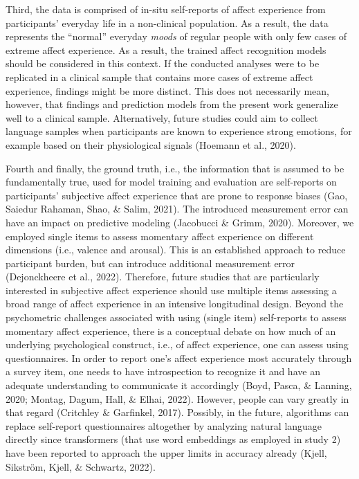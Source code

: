 \documentclass[
  english,
  man,floatsintext]{apa6}
\begin{document}
Third, the data is comprised of in-situ self-reports of affect experience from participants' everyday life in a non-clinical population. As a result, the data represents the ``normal'' everyday \emph{moods} of regular people with only few cases of extreme affect experience. As a result, the trained affect recognition models should be considered in this context. If the conducted analyses were to be replicated in a clinical sample that contains more cases of extreme affect experience, findings might be more distinct. This does not necessarily mean, however, that findings and prediction models from the present work generalize well to a clinical sample. Alternatively, future studies could aim to collect language samples when participants are known to experience strong emotions, for example based on their physiological signals (Hoemann et al., 2020).

Fourth and finally, the ground truth, i.e., the information that is assumed to be fundamentally true, used for model training and evaluation are self-reports on participants' subjective affect experience that are prone to response biases (Gao, Saiedur Rahaman, Shao, \& Salim, 2021). The introduced measurement error can have an impact on predictive modeling (Jacobucci \& Grimm, 2020). Moreover, we employed single items to assess momentary affect experience on different dimensions (i.e., valence and arousal). This is an established approach to reduce participant burden, but can introduce additional measurement error (Dejonckheere et al., 2022). Therefore, future studies that are particularly interested in subjective affect experience should use multiple items assessing a broad range of affect experience in an intensive longitudinal design. Beyond the psychometric challenges associated with using (single item) self-reports to assess momentary affect experience, there is a conceptual debate on how much of an underlying psychological construct, i.e., of affect experience, one can assess using questionnaires. In order to report one's affect experience most accurately through a survey item, one needs to have introspection to recognize it and have an adequate understanding to communicate it accordingly (Boyd, Pasca, \& Lanning, 2020; Montag, Dagum, Hall, \& Elhai, 2022). However, people can vary greatly in that regard (Critchley \& Garfinkel, 2017). Possibly, in the future, algorithms can replace self-report questionnaires altogether by analyzing natural language directly since transformers (that use word embeddings as employed in study 2) have been reported to approach the upper limits in accuracy already (Kjell, Sikström, Kjell, \& Schwartz, 2022).
\end{document}
